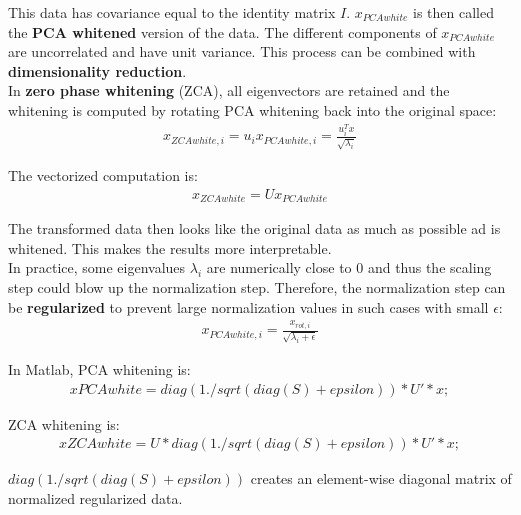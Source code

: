 \documentclass{report}
\begin{document}
This data has covariance equal to the identity matrix $I$. $x_{PCAwhite}$ is then called the {\bf PCA whitened} version of the data.
The different components of $x_{PCAwhite}$ are uncorrelated and have unit variance.
This process can be combined with {\bf dimensionality reduction}.
\\
In {\bf zero phase whitening} (ZCA), all eigenvectors are retained and the whitening is computed by rotating PCA whitening back into the original space:
\begin{align*}
x_{ZCAwhite,i} = u_i x_{PCAwhite,i} = \frac{u_i^T x}{\sqrt{\lambda_i}}
\end{align*}

The vectorized computation is:
\begin{align*}
x_{ZCAwhite} = Ux_{PCAwhite}
\end{align*}

The transformed data then looks like the original data as much as possible ad is whitened. This makes the results more interpretable.
\\
In practice, some eigenvalues $\lambda_i$ are numerically close to 0 and thus the scaling step could blow up the normalization step.
Therefore, the normalization step can be {\bf regularized} to prevent large normalization values in such cases with small $\epsilon$:
\begin{align*}
x_{PCAwhite,i} = \frac{x_{rot,i}}{\sqrt{\lambda_i+\epsilon}}
\end{align*}

In Matlab, PCA whitening is:
\begin{align*}
xPCAwhite = diag(1./sqrt(diag(S) + epsilon)) * U' * x;
\end{align*}

ZCA whitening is:
\begin{align*}
xZCAwhite = U * diag(1./sqrt(diag(S) + epsilon)) * U' * x;
\end{align*}

$diag(1./sqrt(diag(S) + epsilon))$ creates an element-wise diagonal matrix of normalized regularized data.
\end{document}
